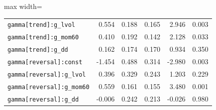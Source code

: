 \begin{table}[!htbp]
\begin{adjustbox}{max width=\textwidth}
\begin{tabular}{lrrrrr}
\texttt{gamma[trend]:g\_lvol} & 0.554 & 0.188 & 0.165 & 2.946 & 0.003\\
\texttt{gamma[trend]:g\_mom60} & 0.410 & 0.192 & 0.142 & 2.128 & 0.033\\
\texttt{gamma[trend]:g\_dd} & 0.162 & 0.174 & 0.170 & 0.934 & 0.350\\
\texttt{gamma[reversal]:const} & -1.454 & 0.488 & 0.314 & -2.980 & 0.003\\
\texttt{gamma[reversal]:g\_lvol} & 0.396 & 0.329 & 0.243 & 1.203 & 0.229\\
\texttt{gamma[reversal]:g\_mom60} & 0.559 & 0.161 & 0.155 & 3.480 & 0.001\\
\texttt{gamma[reversal]:g\_dd} & -0.006 & 0.242 & 0.213 & -0.026 & 0.980\\
\bottomrule
\end{tabular}
\end{adjustbox}
\end{table}
